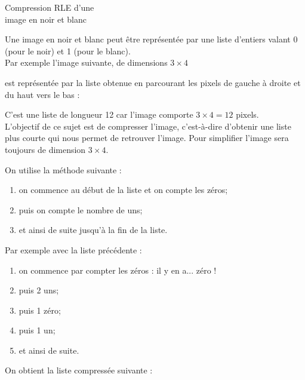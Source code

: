 
\begin{center}
		{\Huge\titlefont\color{UGLiBlue} Compression RLE d'une\\image en noir et blanc}
\end{center}

Une image en noir et blanc peut être représentée par une liste d'entiers valant 0 (pour le noir) et 1 (pour le blanc).\\
Par exemple l'image suivante, de dimensions $3\times 4$ 
\begin{center}
\end{center}

est représentée par la liste obtenue en parcourant les pixels de gauche à droite et du haut vers le bas :


C'est une liste de longueur 12 car l'image comporte $3\times 4 = 12$ pixels.\\


L'objectif de ce sujet est de compresser l'image, c'est-à-dire d'obtenir une liste plus courte qui nous permet de retrouver l'image. Pour simplifier l'image sera toujours de dimension $3\times 4$.

On utilise la méthode suivante :
\begin{enumerate}[--]
	\item on commence au début de la liste et on compte les zéros;
    \item puis on compte le nombre de uns;
    \item et ainsi de suite jusqu'à la fin de la liste.
\end{enumerate}
Par exemple avec la liste précédente :
\begin{enumerate}[--]
	\item on commence par compter les zéros : il y en a... zéro !
    \item puis 2 uns;
    \item puis 1 zéro;
    \item puis 1 un;
    \item et ainsi de suite.
\end{enumerate}
On obtient la liste compressée suivante :

